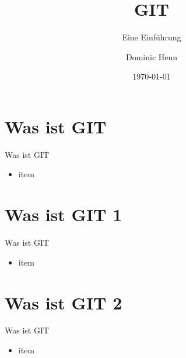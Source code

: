 \documentclass[aspectratio=169]{beamer}
\title{GIT}
\subtitle{Eine Einführung}
\author[Dominic]{Dominic Heun}
\institute{AES Ettlingen - TGJ2/2}
\date{\today}
\begin{document}


  \begin{frame}[plain]
    \titlepage
  \end{frame}

  \section{Was ist GIT}

  \begin{frame}{Was ist GIT}
    \begin{itemize}[<+->]
      \item item
    \end{itemize}
  \end{frame}

  \section{Was ist GIT 1}

  \begin{frame}{Was ist GIT}
    \begin{itemize}[<+->]
      \item item
    \end{itemize}
  \end{frame}

  \section{Was ist GIT 2}

  \begin{frame}{Was ist GIT}
    \begin{itemize}[<+->]
      \item item
    \end{itemize}
  \end{frame}
\end{document}
